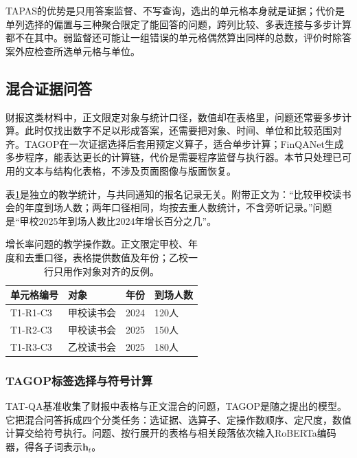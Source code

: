 TAPAS的优势是只用答案监督、不写查询，选出的单元格本身就是证据；代价是单列选择的偏置与三种聚合限定了能回答的问题，跨列比较、多表连接与多步计算都不在其中。弱监督还可能让一组错误的单元格偶然算出同样的总数，评价时除答案外应检查所选单元格与单位。

\subsection{混合证据问答}
\label{sec:nlp-dialogue-hybrid-qa}

财报这类材料中，正文限定对象与统计口径，数值却在表格里，问题还常要多步计算。此时仅找出数字不足以形成答案，还需要把对象、时间、单位和比较范围对齐。TAGOP在一次证据选择后套用预定义算子，适合单步计算；FinQANet生成多步程序，能表达更长的计算链，代价是需要程序监督与执行器。本节只处理已可用的文本与结构化表格，不涉及页面图像与版面恢复。

表\ref{tab:nlp-dialogue-operands}是独立的教学统计，与共同通知的报名记录无关。附带正文为：“比较甲校读书会的年度到场人数；两年口径相同，均按去重人数统计，不含旁听记录。”问题是“甲校2025年到场人数比2024年增长百分之几”。

\begin{table}[htbp]
  \centering
  \begin{tabular}{llll}
    \toprule
    单元格编号 & 对象 & 年份 & 到场人数\\
    \midrule
    T1-R1-C3 & 甲校读书会 & 2024 & 120人\\
    T1-R2-C3 & 甲校读书会 & 2025 & 150人\\
    T1-R3-C3 & 乙校读书会 & 2025 & 180人\\
    \bottomrule
  \end{tabular}
  \caption{增长率问题的教学操作数。正文限定甲校、年度和去重口径，表格提供数值及年份；乙校一行只用作对象对齐的反例。}
  \label{tab:nlp-dialogue-operands}
\end{table}

\subsubsection{TAGOP标签选择与符号计算}
\label{sec:nlp-dialogue-tagop}

TAT-QA基准收集了财报中表格与正文混合的问题，TAGOP是随之提出的模型。它把混合问答拆成四个分类任务：选证据、选算子、定操作数顺序、定尺度，数值计算交给符号执行。问题、按行展开的表格与相关段落依次输入RoBERTa编码器，得各子词表示$\bm h_t$。

